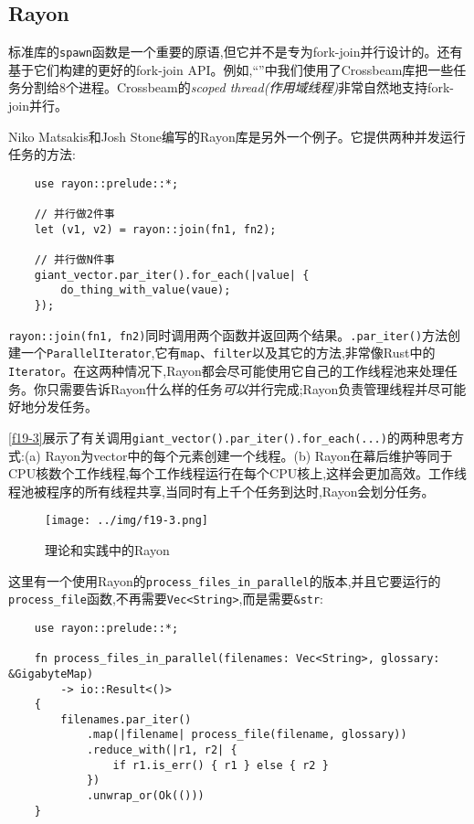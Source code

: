 \subsection{Rayon}

标准库的\texttt{spawn}函数是一个重要的原语,但它并不是专为fork-join并行设计的。还有基于它们构建的更好的fork-join API。例如,“”中我们使用了Crossbeam库把一些任务分割给8个进程。Crossbeam的\emph{scoped thread(作用域线程)}非常自然地支持fork-join并行。

Niko Matsakis和Josh Stone编写的Rayon库是另外一个例子。它提供两种并发运行任务的方法:
\begin{verbatim}
    use rayon::prelude::*;

    // 并行做2件事
    let (v1, v2) = rayon::join(fn1, fn2);

    // 并行做N件事
    giant_vector.par_iter().for_each(|value| {
        do_thing_with_value(vaue);
    });
\end{verbatim}

\texttt{rayon::join(fn1, fn2)}同时调用两个函数并返回两个结果。\texttt{.par\_iter()}方法创建一个\texttt{ParallelIterator},它有\texttt{map}、\texttt{filter}以及其它的方法,非常像Rust中的\texttt{Iterator}。在这两种情况下,Rayon都会尽可能使用它自己的工作线程池来处理任务。你只需要告诉Rayon什么样的任务\emph{可以}并行完成;Rayon负责管理线程并尽可能好地分发任务。

\autoref{f19-3}展示了有关调用\texttt{giant\_vector().par\_iter().for\_each(...)}的两种思考方式:(a) Rayon为vector中的每个元素创建一个线程。(b) Rayon在幕后维护等同于CPU核数个工作线程,每个工作线程运行在每个CPU核上,这样会更加高效。工作线程池被程序的所有线程共享,当同时有上千个任务到达时,Rayon会划分任务。

\begin{figure}[htbp]
    \centering
    \texttt{[image: ../img/f19-3.png]}
    \caption{理论和实践中的Rayon}
    \label{f19-3}
\end{figure}

这里有一个使用Rayon的\texttt{process\_files\_in\_parallel}的版本,并且它要运行的\texttt{process\_file}函数,不再需要\texttt{Vec<String>},而是需要\texttt{\&str}:
\begin{verbatim}
    use rayon::prelude::*;

    fn process_files_in_parallel(filenames: Vec<String>, glossary: &GigabyteMap)
        -> io::Result<()>
    {
        filenames.par_iter()
            .map(|filename| process_file(filename, glossary))
            .reduce_with(|r1, r2| {
                if r1.is_err() { r1 } else { r2 }
            })
            .unwrap_or(Ok(()))
    }
\end{verbatim}

